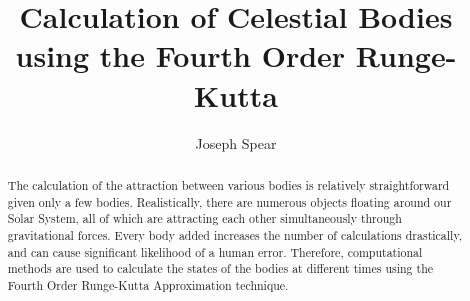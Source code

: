 \documentclass{article}
\begin{document}
\title{Calculation of Celestial Bodies using the Fourth Order Runge-Kutta}
\author{Joseph Spear}

\maketitle


\begin{abstract}
\justify
The calculation of the attraction between various bodies is relatively straightforward given only a few bodies. Realistically, there are numerous objects floating around our Solar System, all of which are attracting each other simultaneously through gravitational forces. Every body added increases the number of calculations drastically, and can cause significant likelihood of a human error. Therefore, computational methods are used to calculate the states of the bodies at different times using the Fourth Order Runge-Kutta Approximation technique.
\end{abstract}
\end{document}
